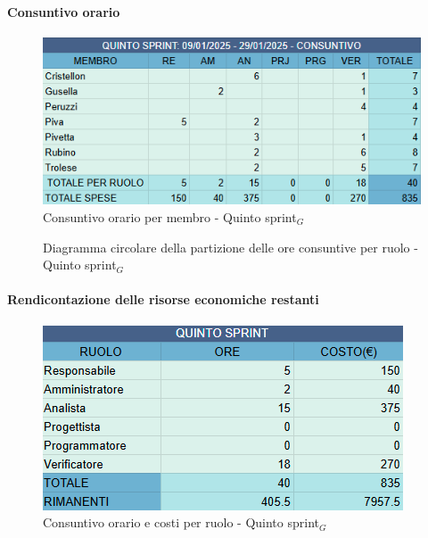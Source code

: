 \documentclass[10pt]{article}
\begin{document}
{{{{{{    \paragraph{Consuntivo orario}\mbox{}\vspace{0.4em}
    \begin{figure}[ht]
    	\centering
    	\includegraphics[width=0.6\linewidth]{consuntivoOreQuintoSprint.png}
    	\caption{Consuntivo orario per membro - Quinto sprint$_G$}
\label{fig:Consuntivo orario per membro - Quinto sprint$_G$}
    \end{figure}

    \begin{figure}[H]
        \centering
        \caption{Diagramma circolare della partizione delle ore consuntive per ruolo - Quinto sprint$_G$ }
        \label{fig:Diagramma circolare della partizione delle ore consuntive per ruolo - Quinto sprint$_G$}
    \end{figure}

    \paragraph{Rendicontazione delle risorse economiche restanti}\mbox{}\vspace{0.4em}
    \begin{figure}[H]
    	\centering
    	\includegraphics[width=0.6\linewidth]{oreCostiQuintoSprint.png}
    	\caption{Consuntivo orario e costi per ruolo - Quinto sprint$_G$}
    	\label{fig:Consuntivo orario e costi per ruolo - Quinto sprint$_G$}
    \end{figure}
    
}}}}}}
\end{document}
